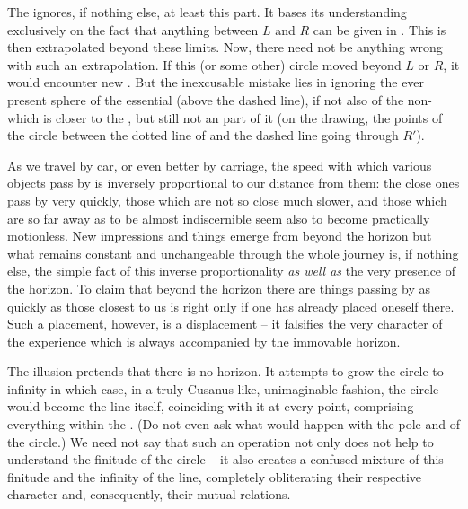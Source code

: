 \pa %
The  ignores, if nothing else, at
least this part.  It bases its understanding exclusively on the fact
that anything between $L$ and $R$ can be given in .  This is then extrapolated beyond these limits.  Now,
there need not be anything wrong with such an extrapolation.  If this
(or some other) circle moved beyond $L$ or $R$, it would encounter new
.  But the inexcusable mistake lies in ignoring the
ever present sphere of the essential  (above the
dashed line), if not also of the non- which is closer to
the , but still not an  part of it
(on the drawing, the points of the circle between the dotted line of
 and the dashed line going through $R'$).

As we travel by car, or even better by carriage, the speed with which various
objects pass by is inversely proportional to our distance from them: the close
ones pass by very quickly, those which are not so close much slower, and those
which are so far away as to be almost indiscernible seem also to become
practically motionless. New impressions and things emerge from beyond the
horizon but what remains constant and unchangeable through the whole journey is,
if nothing else, the simple fact of this inverse proportionality {\em
  as well as} the very presence of the horizon. To claim that beyond the horizon
there are things passing by as quickly as those closest to us is right only if
one has already placed oneself there. Such a placement, however, is a
displacement -- it falsifies the very character of the experience which is always
accompanied by the immovable horizon.

The illusion pretends that there is no horizon. It attempts to grow the circle
to infinity in which case, in a truly Cusanus-like, unimaginable fashion, the
circle would become the line itself, coinciding with it at every point,
comprising everything within the \hoa. (Do not even ask what would happen with
the pole and  of the circle.)  We need not say that such an
operation not only does not help to understand the finitude of the circle -- it
also creates a confused mixture of this finitude and the infinity of the line,
completely obliterating their respective character and, consequently, their
mutual relations.





